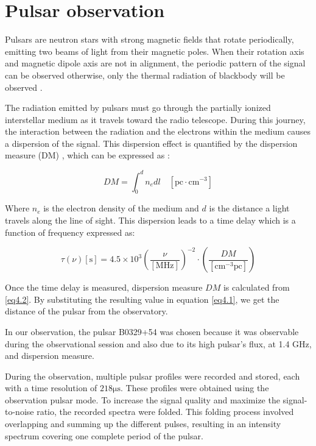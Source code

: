 \documentclass[12pt]{article}
\begin{document}
\section{Pulsar observation}
Pulsars are neutron stars with strong magnetic fields that rotate periodically, emitting two beams of light from their magnetic poles. When their rotation axis and magnetic dipole axis are not in alignment, the periodic pattern of the signal can be observed otherwise, only the thermal radiation of blackbody will be observed \cite{lecturenote}.

The radiation emitted by pulsars must go through the partially ionized interstellar medium as it travels toward the radio telescope. During this journey, the interaction between the radiation and the electrons within the medium causes a dispersion of the signal. This dispersion effect is quantified by the dispersion measure (DM) \cite{lecturenote}, which can be expressed as \cite{lecturenote}:

\begin{equation}
DM = \int_{0}^{d} n_e dl \quad [\mathrm{pc \cdot cm^{-3}}]
\label{eq4.1}
\end{equation}

Where $n_e$ is the electron density of the medium and $d$ is the distance a light travels along the line of sight. This dispersion leads to a time delay which is a function of frequency \cite{DM} expressed as:

\begin{equation}
\tau(\nu) [\mathrm{s}] = 4.5 \times 10^3 \left( \dfrac{\nu}{[\mathrm{MHz}]} \right)^{-2} \cdot \left( \dfrac{DM}{\mathrm{[cm^{-3}pc]}} \right) 
\label{eq4.2}
\end{equation}

Once the time delay is measured, dispersion measure $DM$ is calculated from \ref{eq4.2}. By substituting the resulting value in equation \ref{eq4.1}, we get the distance of the pulsar from the observatory.


In our observation, the pulsar B0329+54 \cite{pulsars, Manchester_2005} was chosen because it was observable during the observational session and also due to its high pulsar’s flux, at 1.4 GHz, and dispersion measure. 

During the observation, multiple pulsar profiles were recorded and stored, each with a time resolution of $218 \mathrm{\mu s}$. These profiles were obtained using the observation pulsar mode. To increase the signal quality and maximize the signal-to-noise ratio, the recorded spectra were folded. This folding process involved overlapping and summing up the different pulses, resulting in an intensity spectrum covering one complete period of the pulsar.
\end{document}
